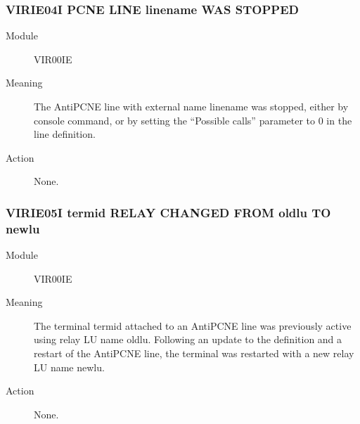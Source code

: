 \documentclass[letterpaper,10pt,english]{sphinxmanual}
\begin{document}
\subsubsection{VIRIE04I PCNE LINE linename WAS STOPPED}
\label{\detokenize{messages:virie04i-pcne-line-linename-was-stopped}}\begin{description}
\item[{Module}] \leavevmode
VIR00IE

\item[{Meaning}] \leavevmode
The AntiPCNE line with external name linename was stopped, either by console command, or by setting the “Possible calls” parameter to 0 in the line definition.

\item[{Action}] \leavevmode
None.

\end{description}


\subsubsection{VIRIE05I termid RELAY CHANGED FROM oldlu TO newlu}
\label{\detokenize{messages:virie05i-termid-relay-changed-from-oldlu-to-newlu}}\begin{description}
\item[{Module}] \leavevmode
VIR00IE

\item[{Meaning}] \leavevmode
The terminal termid attached to an AntiPCNE line was previously active using relay LU name oldlu. Following an update to the definition and a restart of the AntiPCNE line, the terminal was restarted with a new relay LU name newlu.

\item[{Action}] \leavevmode
None.

\end{description}
\end{document}
